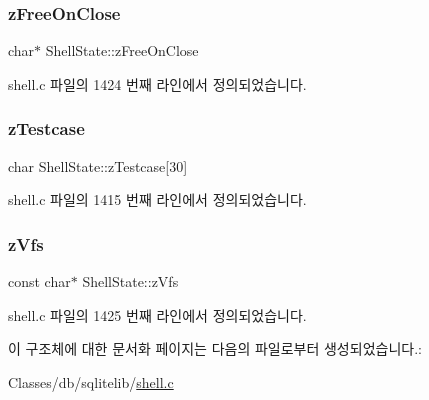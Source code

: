 \subsubsection{\texorpdfstring{z\+Free\+On\+Close}{zFreeOnClose}}
{\footnotesize\ttfamily char$\ast$ Shell\+State\+::z\+Free\+On\+Close}



shell.\+c 파일의 1424 번째 라인에서 정의되었습니다.

\mbox{\label{struct_shell_state_a8c9b32aa186f1b581fc57f324cad108e}} 
\subsubsection{\texorpdfstring{z\+Testcase}{zTestcase}}
{\footnotesize\ttfamily char Shell\+State\+::z\+Testcase\mbox{[}30\mbox{]}}



shell.\+c 파일의 1415 번째 라인에서 정의되었습니다.

\mbox{\label{struct_shell_state_a7a17ec105e801f6d466f3dd8e29521e6}} 
\subsubsection{\texorpdfstring{z\+Vfs}{zVfs}}
{\footnotesize\ttfamily const char$\ast$ Shell\+State\+::z\+Vfs}



shell.\+c 파일의 1425 번째 라인에서 정의되었습니다.



이 구조체에 대한 문서화 페이지는 다음의 파일로부터 생성되었습니다.\+:\begin{DoxyCompactItemize}
\item 
Classes/db/sqlitelib/\hyperlink{shell_8c}{shell.\+c}\end{DoxyCompactItemize}
